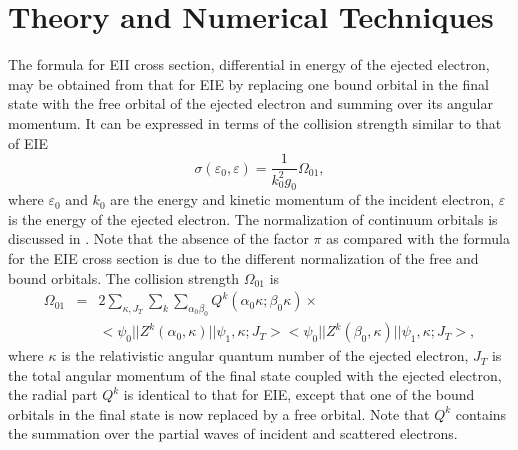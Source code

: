 \documentclass{elsart}
\begin{document}
\section{Theory and Numerical Techniques}
\label{sec_theory}
The formula for EII cross section, differential in energy of the ejected
electron, may be obtained from that for EIE by replacing one bound orbital in
the final state with the free orbital of the ejected electron and summing 
over its angular momentum. It can be expressed in terms of the collision
strength similar to that of EIE 
\begin{equation}
\label{eq_cross}
\sigma(\varepsilon_0,\varepsilon) = \frac{1}{k_0^2g_0}\Omega_{01},
\end{equation}
where $\varepsilon_0$ and $k_0$ are the energy and kinetic momentum of the
incident electron, $\varepsilon$ is the energy of the ejected electron. The
normalization of continuum orbitals is discussed in . Note
that the absence of the 
factor $\pi$ as compared with the formula for the EIE cross section is due to
the different normalization of the free and bound orbitals. The collision
strength $\Omega_{01}$ is \citep{gu01b}
\begin{eqnarray}
\label{eq_cs}
\Omega_{01} &=& 2\sum_{\kappa,J_T}\sum_{k}\sum_{\alpha_0\beta_0}
Q^k(\alpha_0\kappa;\beta_0\kappa)\times \nonumber\\ 
&&<\psi_0||Z^k(\alpha_0,\kappa)||\psi_1,\kappa;J_T>
<\psi_0||Z^k(\beta_0,\kappa)||\psi_1,\kappa;J_T>,
\end{eqnarray}
where $\kappa$ is the relativistic angular quantum number of the ejected
electron, $J_T$ is the total angular momentum of the final state coupled with
the ejected electron,
the radial part $Q^k$ is identical to that for EIE, except that one of
the bound orbitals in the final state is now replaced by a free orbital. Note
that $Q^k$ contains the summation over the partial waves of incident and
scattered electrons.
\end{document}
